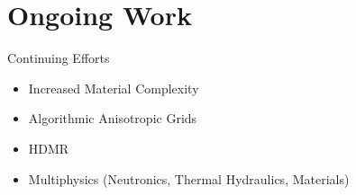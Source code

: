\documentclass{beamer}
\begin{document}
\section{Ongoing Work}
\begin{frame}{Continuing Efforts}
\begin{itemize}
\item Increased Material Complexity
\item Algorithmic Anisotropic Grids
\item HDMR
\item Multiphysics (Neutronics, Thermal Hydraulics, Materials)
\end{itemize}
\end{frame}

\section{}
\begin{frame}{}

\end{frame}
\end{document}
